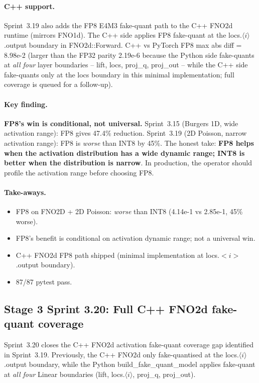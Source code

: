 \documentclass[10pt,twocolumn]{article}
\renewcommand{\texttt}[1]{{\normalfont\ttfamily #1}\normalfont\rmfamily}
\begin{document}
\paragraph{C++ support.}
Sprint~3.19 also adds the FP8 E4M3 fake-quant
path to the C++ FNO2d runtime (mirrors FNO1d).
The C++ side applies FP8 fake-quant at the
\texttt{locs.$\langle i\rangle$.output} boundary
in \texttt{FNO2d::Forward}.  C++ vs PyTorch FP8
max abs diff = 8.98e-2 (larger than the FP32
parity 2.19e-6 because the Python side fake-quants
at \emph{all four} layer boundaries -- lift, locs,
proj\_q, proj\_out -- while the C++ side fake-quants
only at the locs boundary in this minimal
implementation; full coverage is queued for a
follow-up).

\paragraph{Key finding.}
\textbf{FP8's win is conditional, not universal.}
Sprint~3.15 (Burgers 1D, wide activation range):
FP8 gives 47.4\% reduction.  Sprint~3.19 (2D
Poisson, narrow activation range): FP8 is
\emph{worse} than INT8 by 45\%.  The honest take:
\textbf{FP8 helps when the activation distribution
has a wide dynamic range; INT8 is better when the
distribution is narrow}.  In production, the
operator should profile the activation range
before choosing FP8.

\paragraph{Take-aways.}
\begin{itemize}
\item FP8 on FNO2D + 2D Poisson: \emph{worse}
than INT8 (4.14e-1 vs 2.85e-1, 45\% worse).
\item FP8's benefit is conditional on activation
dynamic range; not a universal win.
\item C++ FNO2d FP8 path shipped (minimal
implementation at locs.$<i>$.output boundary).
\item 87/87 pytest pass.
\end{itemize}

\subsection{Stage 3 Sprint 3.20: Full C++ FNO2d fake-quant coverage}
\label{sec:fno2d-fq-coverage}

Sprint~3.20 closes the C++ FNO2d activation
fake-quant coverage gap identified in
Sprint~3.19.  Previously, the C++ FNO2d only
fake-quantised at the \texttt{locs.$\langle
i\rangle$.output} boundary, while the Python
\texttt{build\_fake\_quant\_model} applies
fake-quant at \emph{all four} Linear boundaries
(\texttt{lift}, \texttt{locs.$\langle
i\rangle$}, \texttt{proj\_q}, \texttt{proj\_out}).
\end{document}
